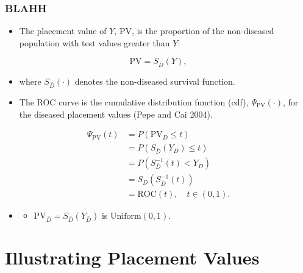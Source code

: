 \documentclass[t]{beamer}
\begin{document}
\begin{frame}
\frametitle{BLAHH}
\begin{itemize}
\item The placement value of $Y$, $\text{PV}$, is the proportion of the non-diseased population with test values greater than $Y$:
\end{itemize}
$$\text{PV} = S_{\bar{D}}(Y),$$
\begin{itemize}
\vspace{-.2in}
\item[] where $S_{\bar{D}}(\cdot)$ denotes the non-diseased survival function.
\item The ROC curve is the cumulative distribution function (cdf), $\Psi_{\text{PV}}(\cdot)$, for the diseased placement values (Pepe and Cai 2004).
\end{itemize}
\begin{align*}
\Psi_{\text{PV}}(t) &=
P(\text{PV}_D \leq t)\\ &= P(S_{\bar{D}}(Y_D) \leq t) \\
	&= P(S_{\bar{D}}^{-1}(t) < Y_D) \\
	&= S_D(S_{\bar{D}}^{-1}(t)) \\
	&= \text{ROC}(t), \quad t \in (0, 1).
\end{align*}
\vspace{-.2in}
\begin{itemize}
\item[]
\begin{itemize}
\item $\text{PV}_{\bar{D}} = S_{\bar{D}}(Y_{\bar{D}})$ is $\text{Uniform}(0, 1)$.
\end{itemize}
\end{itemize}
\end{frame}

\section{Illustrating Placement Values}
\end{document}
